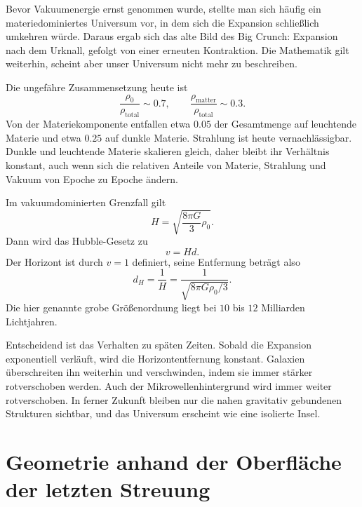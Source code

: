 Bevor Vakuumenergie ernst genommen wurde, stellte man sich häufig ein materiedominiertes Universum vor, in dem sich die Expansion schließlich umkehren würde. Daraus ergab sich das alte Bild des Big Crunch: Expansion nach dem Urknall, gefolgt von einer erneuten Kontraktion. Die Mathematik gilt weiterhin, scheint aber unser Universum nicht mehr zu beschreiben.

\begin{classroomqa}\end{classroomqa}

Die ungefähre Zusammensetzung heute ist
\begin{equation}
\frac{\rho_0}{\rho_{\text{total}}}\sim 0.7,
\qquad
\frac{\rho_{\text{matter}}}{\rho_{\text{total}}}\sim 0.3.
\end{equation}
Von der Materiekomponente entfallen etwa \(0.05\) der Gesamtmenge auf leuchtende Materie und etwa \(0.25\) auf dunkle Materie. Strahlung ist heute vernachlässigbar. Dunkle und leuchtende Materie skalieren gleich, daher bleibt ihr Verhältnis konstant, auch wenn sich die relativen Anteile von Materie, Strahlung und Vakuum von Epoche zu Epoche ändern.

Im vakuumdominierten Grenzfall gilt
\begin{equation}
H=\sqrt{\frac{8\pi G}{3}\rho_0}.
\end{equation}
Dann wird das Hubble-Gesetz zu
\begin{equation}
v=Hd.
\end{equation}
Der Horizont ist durch \(v=1\) definiert, seine Entfernung beträgt also
\begin{equation}
d_H=\frac{1}{H}
=
\frac{1}{\sqrt{8\pi G\rho_0/3}}.
\end{equation}
Die hier genannte grobe Größenordnung liegt bei \(10\) bis \(12\) Milliarden Lichtjahren.

Entscheidend ist das Verhalten zu späten Zeiten. Sobald die Expansion exponentiell verläuft, wird die Horizontentfernung konstant. Galaxien überschreiten ihn weiterhin und verschwinden, indem sie immer stärker rotverschoben werden. Auch der Mikrowellenhintergrund wird immer weiter rotverschoben. In ferner Zukunft bleiben nur die nahen gravitativ gebundenen Strukturen sichtbar, und das Universum erscheint wie eine isolierte Insel.

\section{Geometrie anhand der Oberfläche der letzten Streuung}

